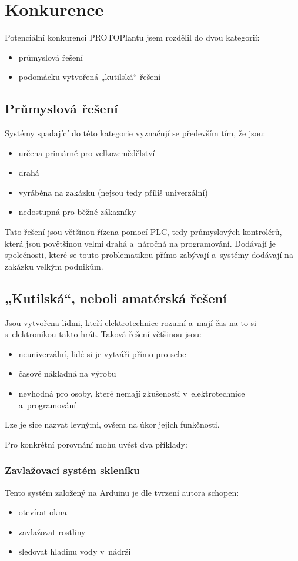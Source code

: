 \chapter{Konkurence}
Potenciální konkurenci PROTOPlantu jsem rozdělil do dvou kategorií:
\begin{itemize}
    \item průmyslová řešení
    \item podomácku vytvořená „kutilská“ řešení
\end{itemize}

\section{Průmyslová řešení}
Systémy spadající do této kategorie vyznačují se především tím, že jsou:
\begin{itemize}
    \item určena primárně pro velkozemědělství
    \item drahá
    \item vyráběna na zakázku (nejsou tedy příliš univerzální)
    \item nedostupná pro běžné zákazníky
\end{itemize}

Tato řešení jsou většinou řízena pomocí PLC, tedy průmyslových kontrolérů, která jsou povětšinou velmi drahá a~náročná na programování.
Dodávají je společnosti, které se touto problematikou přímo zabývají a~systémy dodávají na zakázku velkým podnikům.

\section{„Kutilská“, neboli amatérská řešení}
Jsou vytvořena lidmi, kteří elektrotechnice rozumí a~mají čas na to si s~elektronikou takto hrát.
Taková řešení většinou jsou:
\begin{itemize}
    \item neuniverzální, lidé si je vytváří přímo pro sebe
    \item časově nákladná na výrobu
    \item nevhodná pro osoby, které nemají zkušenosti v~elektrotechnice a~programování
\end{itemize}

Lze je sice nazvat levnými, ovšem na úkor jejich funkčnosti.

Pro konkrétní porovnání mohu uvést dva příklady:
\subsection{Zavlažovací systém skleníku}
Tento systém \cite{ARDUGREENHOUSE} založený na Arduinu je dle tvrzení autora schopen:
\begin{itemize}
    \item otevírat okna
    \item zavlažovat rostliny
    \item sledovat hladinu vody v~nádrži
\end{itemize}

